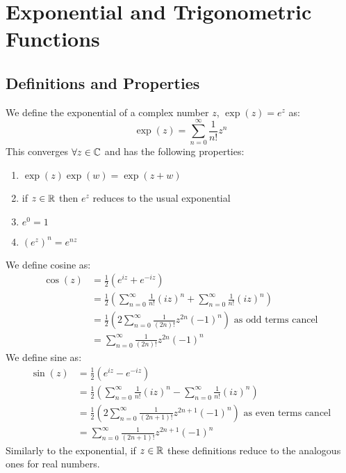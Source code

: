 \documentclass[../main.tex]{subfiles}
\begin{document}
\section{Exponential and Trigonometric Functions}
\subsection{Definitions and Properties}
We define the exponential of a complex number $z$, $\exp(z) = e^z$ as:
\[
  \exp(z) = \sum_{n=0}^{\infty} \frac{1}{n!} z^n
\]
This converges $\forall z \in \mathbb{C}$ and has the following properties:
\begin{enumerate}
  \item $\exp(z)\exp(w) = \exp(z + w)$
  \item if $z \in \mathbb{R}$ then $e^z$ reduces to the usual exponential
  \item $e^0 = 1$
  \item $(e^z)^n = e^{nz}$
\end{enumerate}
We define cosine as:
\begin{align*}
  \cos(z) &= \frac{1}{2}(e^{iz} + e^{-iz}) \\
          &= \frac{1}{2}\left(\sum_{n=0}^{\infty} \frac{1}{n!} (iz)^{n} + \sum_{n=0}^{\infty} \frac{1}{n!} (iz)^{n}\right) \\
          &= \frac{1}{2} \left(2\sum_{n=0}^{\infty} \frac{1}{(2n)!} z^{2n} (-1)^{n}\right) \text{ as odd terms cancel}\\
          &= \sum_{n=0}^{\infty} \frac{1}{(2n)!} z^{2n} (-1)^{n}
\end{align*}
We define sine as:
\begin{align*}
  \sin(z) &= \frac{1}{2}(e^{iz} - e^{-iz}) \\
          &= \frac{1}{2}\left(\sum_{n=0}^{\infty} \frac{1}{n!} (iz)^{n} - \sum_{n=0}^{\infty} \frac{1}{n!} (iz)^{n}\right) \\
          &= \frac{1}{2} \left(2\sum_{n=0}^{\infty} \frac{1}{(2n + 1)!} z^{2n + 1} (-1)^{n}\right) \text{ as even terms cancel}\\
          &= \sum_{n=0}^{\infty} \frac{1}{(2n + 1)!} z^{2n + 1} (-1)^{n}
\end{align*}
Similarly to the exponential, if $z \in \mathbb{R}$ these definitions reduce to the analogous ones for real numbers.
\end{document}
